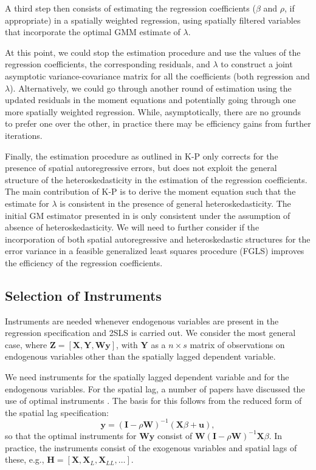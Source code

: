 \documentclass{article}
\begin{document}
A third step then consists of estimating the regression coefficients ($\beta$ and $\rho$, if
appropriate) in a spatially weighted regression, using spatially filtered variables that incorporate the
optimal GMM estimate of $\lambda$.

At this point, we could stop the estimation procedure and use the values of the regression
coefficients, the corresponding residuals, and $\lambda$ to construct a joint asymptotic 
variance-covariance matrix for all the coefficients (both regression and $\lambda$).
Alternatively, we could go through another round of estimation using the updated residuals
in the moment equations and potentially going through one more spatially weighted 
regression. While, asymptotically, there are no grounds to prefer one over the other, in
practice there may be efficiency gains from further iterations.

Finally, the estimation procedure as outlined in K-P only corrects for the presence of
spatial autoregressive errors, but does not exploit the general structure of the 
heteroskedasticity in the estimation of the regression coefficients. The main contribution
of K-P is to derive the moment equation such that the estimate for $\lambda$ is
consistent in the presence of general heteroskedasticity. The initial GM estimator presented
in \cite{KelejianPrucha:98,KelejianPrucha:99a} is only consistent under the assumption
of absence of heteroskedasticity. We will need to further consider if the incorporation of
both spatial autoregressive and heteroskedastic structures for the error variance 
in a feasible generalized least squares procedure (FGLS)
improves the efficiency of the regression coefficients.

\subsection{Selection of Instruments}
Instruments are needed whenever endogenous variables are present in the
regression specification and 2SLS is carried out. We consider the most
general case, where $\mathbf{Z} = [ \mathbf{X}, \mathbf{Y}, \mathbf{Wy} ]$, with
$\mathbf{Y}$ as a $n \times s$ matrix of observations on endogenous variables
other than the spatially lagged dependent variable.

We need instruments for the spatially lagged dependent variable and for the endogenous
variables. For the spatial lag,
a number of papers have discussed the use of optimal instruments
\cite[e.g.,][]{Lee:03,Dasetal:03,Kelejianetal:04,Lee:07}. 
The basis for this follows from the reduced form of the spatial lag
specification:
\begin{equation*}
\mathbf{y} = (\mathbf{I} - \rho \mathbf{W} )^{-1} (\mathbf{X}\beta + \mathbf{u}),
\end{equation*}
so that the optimal instruments for $\mathbf{Wy}$ consist of $\mathbf{W}(\mathbf{I} - \rho \mathbf{W} )^{-1} \mathbf{X}\beta$. In practice, the instruments
consist of the exogenous variables and spatial lags of these, e.g., 
$\mathbf{H} = [ \mathbf{X}, \mathbf{X}_L, \mathbf{X}_{LL}, \dots ]$.
\end{document}
